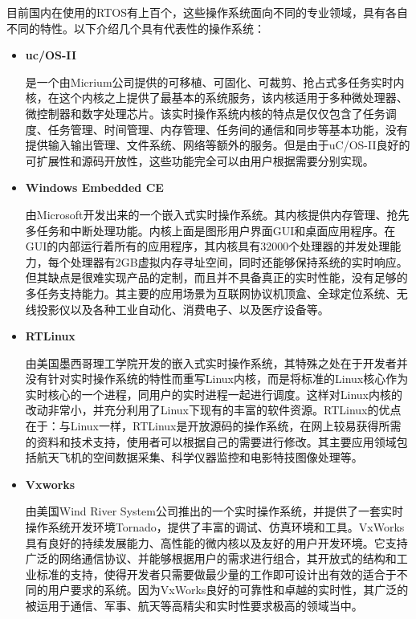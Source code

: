 	目前国内在使用的RTOS有上百个，这些操作系统面向不同的专业领域，具有各自不同的特性。以下介绍几个具有代表性的操作系统：
\begin{itemize}
\item \textbf{uc/OS-II}
	
	是一个由Micrium公司提供的可移植、可固化、可裁剪、抢占式多任务实时内核，在这个内核之上提供了最基本的系统服务，该内核适用于多种微处理器、微控制器和数字处理芯片。该实时操作系统内核的特点是仅仅包含了任务调度、任务管理、时间管理、内存管理、任务间的通信和同步等基本功能，没有提供输入输出管理、文件系统、网络等额外的服务。但是由于uC/OS-II良好的可扩展性和源码开放性，这些功能完全可以由用户根据需要分别实现。
	
\item \textbf{Windows Embedded CE}

	由Microsoft开发出来的一个嵌入式实时操作系统。其内核提供内存管理、抢先多任务和中断处理功能。内核上面是图形用户界面GUI和桌面应用程序。在GUI的内部运行着所有的应用程序，其内核具有32000个处理器的并发处理能力，每个处理器有2GB虚拟内存寻址空间，同时还能够保持系统的实时响应\cite{WindowsEmbeddedCE6.0}。但其缺点是很难实现产品的定制，而且并不具备真正的实时性能，没有足够的多任务支持能力。其主要的应用场景为互联网协议机顶盒、全球定位系统、无线投影仪以及各种工业自动化、消费电子、以及医疗设备等。
	
\item \textbf{RTLinux}
	
	由美国墨西哥理工学院开发的嵌入式实时操作系统，其特殊之处在于开发者并没有针对实时操作系统的特性而重写Linux内核，而是将标准的Linux核心作为实时核心的一个进程，同用户的实时进程一起进行调度。这样对Linux内核的改动非常小，并充分利用了Linux下现有的丰富的软件资源。RTLinux的优点在于：与Linux一样，RTLinux是开放源码的操作系统，在网上较易获得所需的资料和技术支持，使用者可以根据自己的需要进行修改。其主要应用领域包括航天飞机的空间数据采集、科学仪器监控和电影特技图像处理等。
	
\item \textbf{Vxworks}

	由美国Wind River System公司推出的一个实时操作系统，并提供了一套实时操作系统开发环境Tornado，提供了丰富的调试、仿真环境和工具。VxWorks具有良好的持续发展能力、高性能的微内核以及友好的用户开发环境。它支持广泛的网络通信协议、并能够根据用户的需求进行组合，其开放式的结构和工业标准的支持，使得开发者只需要做最少量的工作即可设计出有效的适合于不同的用户要求的系统。因为VxWorks良好的可靠性和卓越的实时性，其广泛的被运用于通信、军事、航天等高精尖和实时性要求极高的领域当中。	
\end{itemize}	
		
